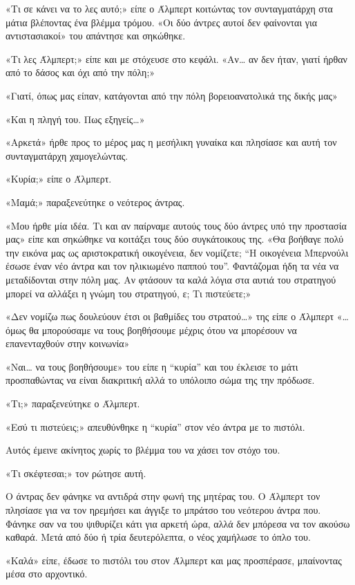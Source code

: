 \documentclass[12pt,twoside, openany]{book}
\begin{document}
«Τι σε κάνει να το λες αυτό;» είπε ο Άλμπερτ κοιτώντας τον συνταγματάρχη στα μάτια βλέποντας ένα βλέμμα τρόμου. «Οι δύο άντρες αυτοί δεν φαίνονται για αντιστασιακοί» του απάντησε και σηκώθηκε.

«Τι λες Άλμπερτ;» είπε και με στόχευσε στο κεφάλι. «Αν… αν δεν ήταν, γιατί ήρθαν από το δάσος και όχι από την πόλη;»

«Γιατί, όπως μας είπαν, κατάγονται από την πόλη βορειοανατολικά της δικής μας»

«Και η πληγή του. Πως εξηγείς…»

«Αρκετά» ήρθε προς το μέρος μας η μεσήλικη γυναίκα και πλησίασε και αυτή τον συνταγματάρχη χαμογελώντας.

«Κυρία;» είπε ο Άλμπερτ.

«Μαμά;» παραξενεύτηκε ο νεότερος άντρας.

«Μου ήρθε μία ιδέα. Τι και αν παίρναμε αυτούς τους δύο άντρες υπό την προστασία μας» είπε και σηκώθηκε να κοιτάξει τους δύο συγκάτοικους της. «Θα βοήθαγε πολύ την εικόνα μας ως αριστοκρατική οικογένεια, δεν νομίζετε; “Η οικογένεια Μπερνούλι έσωσε έναν νέο άντρα και τον ηλικιωμένο παππού του”. Φαντάζομαι ήδη τα νέα να μεταδίδονται στην πόλη μας. Αν φτάσουν τα καλά λόγια στα αυτιά του στρατηγού μπορεί να αλλάξει η γνώμη του στρατηγού, ε; Τι πιστεύετε;»

«Δεν νομίζω πως δουλεύουν έτσι οι βαθμίδες του στρατού…» της είπε ο Άλμπερτ «…όμως θα μπορούσαμε να τους βοηθήσουμε μέχρις ότου να μπορέσουν να επανενταχθούν στην κοινωνία»

«Ναι… να τους βοηθήσουμε» του είπε η “κυρία” και του έκλεισε το μάτι προσπαθώντας να είναι διακριτική αλλά το υπόλοιπο σώμα της την πρόδωσε.

«Τι;» παραξενεύτηκε ο Άλμπερτ.

«Εσύ τι πιστεύεις;» απευθύνθηκε η “κυρία” στον νέο άντρα με το πιστόλι.

Αυτός έμεινε ακίνητος χωρίς το βλέμμα του να χάσει τον στόχο του.

«Τι σκέφτεσαι;» τον ρώτησε αυτή.

Ο άντρας δεν φάνηκε να αντιδρά στην φωνή της μητέρας του. Ο Άλμπερτ τον πλησίασε για να τον ηρεμήσει και άγγιξε το μπράτσο του νεότερου άντρα που. Φάνηκε σαν να του ψιθυρίζει κάτι για αρκετή ώρα, αλλά δεν μπόρεσα να τον ακούσω καθαρά. Μετά από δύο ή τρία δευτερόλεπτα, ο νέος χαμήλωσε το όπλο του.

«Καλά» είπε, έδωσε το πιστόλι του στον Άλμπερτ και μας προσπέρασε, μπαίνοντας μέσα στο αρχοντικό.
\end{document}

